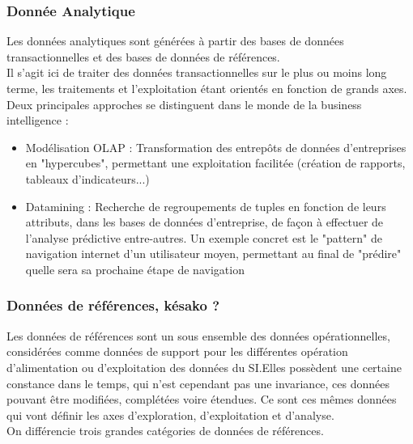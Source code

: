 \subsubsection{Donnée Analytique}

Les données analytiques sont générées à partir des bases de données transactionnelles et des bases de données de références.\\
Il s'agit ici de traiter des données transactionnelles sur le plus ou moins long terme, les traitements et l'exploitation étant orientés en fonction de grands axes.\\
Deux principales approches se distinguent dans le monde de la business intelligence :
\begin{itemize}
\item Modélisation OLAP : Transformation des entrepôts de données d'entreprises en "hypercubes", permettant une exploitation facilitée (création de rapports, tableaux d'indicateurs...)
\item Datamining : Recherche de regroupements de tuples en fonction de leurs attributs, dans les bases de données d'entreprise, de façon à effectuer de l'analyse prédictive entre-autres. Un exemple concret est le "pattern" de navigation internet d'un utilisateur moyen, permettant au final de "prédire" quelle sera sa prochaine étape de navigation
\end{itemize}

\subsubsection{Données de références, késako ? }

Les données de références sont un sous ensemble des données opérationnelles, considérées comme données de support pour les différentes opération d'alimentation ou d'exploitation des données du SI.Elles possèdent une certaine constance dans le temps, qui n'est cependant pas une invariance, ces données pouvant être modifiées, complétées voire étendues. Ce sont ces mêmes données qui vont définir les axes d'exploration, d'exploitation et d'analyse.\\
On différencie trois grandes catégories de données de références.

